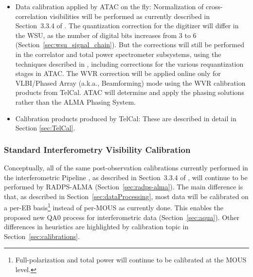 \begin{itemize}[itemsep=-0.5em]
    \item Data calibration applied by ATAC on the fly: Normalization of cross-correlation visibilities will be performed as currently described in Section~3.3.4 of \cite{CSA-IA}. The quantization correction for the digitizer will differ in the WSU, as the number of digital bits increases from 3 to 6 (Section~\ref{sec:wsu_signal_chain}). But the corrections will still be performed in the correlator and total power spectrometer subsystems, using the techniques described in \cite{QC}, including corrections for the various requantization stages in ATAC. The WVR correction will be applied online only for VLBI/Phased Array (a.k.a., Beamforming) mode using the WVR calibration products from TelCal. ATAC will determine and apply the phasing solutions rather than the ALMA Phasing System.
    \item Calibration products produced by TelCal: These are described in detail in Section \ref{sec:TelCal}.
\end{itemize}


\subsubsection{Standard Interferometry Visibility Calibration}  
Conceptually, all of the same post-observation calibrations currently performed in the interferometric Pipeline \cite{ALMApipelineHeuristics}, as described in Section~3.3.4 of \cite{CSA-IA}, will continue to be performed by RADPS-ALMA (Section~\ref{sec:radps-alma}).  The main difference is that, as described in Section~\ref{sec:dataProcessing}, most data will be calibrated on a per-EB basis\footnote{Full-polarization and total power will continue to be calibrated at the MOUS level.} instead of per-MOUS as currently done. This enables the proposed new QA0 process for interferometric data (Section~\ref{sec:aqua}). Other differences in heuristics are highlighted by calibration topic in Section~\ref{sec:calibrations}.


